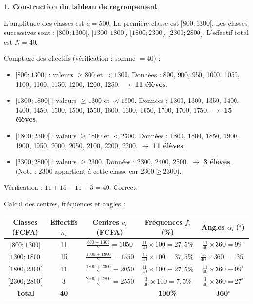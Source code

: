 \documentclass[11pt]{article}
\begin{document}
\begin{exoresolu}
\underline{\textbf{1. Construction du tableau de regroupement}}

L'amplitude des classes est $a = 500$. La première classe est $[800 ; 1300[$. Les classes successives sont :
$[800 ; 1300[$, $[1300 ; 1800[$, $[1800 ; 2300[$, $[2300 ; 2800[$.
L'effectif total est $N = 40$.

Comptage des effectifs (vérification : somme $= 40$) :
\begin{itemize}
    \item $[800 ; 1300[$ : valeurs $\ge 800$ et $< 1300$.
        Données : 800, 900, 950, 1000, 1050, 1100, 1100, 1150, 1200, 1200, 1250. $\rightarrow$ \textbf{11 élèves}.
    \item $[1300 ; 1800[$ : valeurs $\ge 1300$ et $< 1800$.
        Données : 1300, 1300, 1350, 1400, 1400, 1450, 1500, 1500, 1550, 1600, 1600, 1650, 1700, 1700, 1750. $\rightarrow$ \textbf{15 élèves}.
    \item $[1800 ; 2300[$ : valeurs $\ge 1800$ et $< 2300$.
        Données : 1800, 1800, 1850, 1900, 1900, 1950, 2000, 2050, 2100, 2200, 2200. $\rightarrow$ \textbf{11 élèves}.
    \item $[2300 ; 2800[$ : valeurs $\ge 2300$.
        Données : 2300, 2400, 2500. $\rightarrow$ \textbf{3 élèves}. (Note : 2300 appartient à cette classe car $2300 \ge 2300$).
\end{itemize}
Vérification : $11 + 15 + 11 + 3 = 40$. Correct.

Calcul des centres, fréquences et angles :
\begin{center}
\begin{tabular}{|c|c|c|c|c|}\hline
\textbf{Classes (FCFA)} & \textbf{Effectifs $n_i$} & \textbf{Centres $c_i$ (FCFA)} & \textbf{Fréquences $f_i$ (\%)} & \textbf{Angles $\alpha_i$ ($^\circ$)} \\\hline
$[800 ; 1300[$ & 11 & $\frac{800+1300}{2} = 1050$ & $\frac{11}{40}\times 100 = 27,5\%$ & $\frac{11}{40}\times 360 = 99^\circ$ \\\hline
$[1300 ; 1800[$ & 15 & $\frac{1300+1800}{2} = 1550$ & $\frac{15}{40}\times 100 = 37,5\%$ & $\frac{15}{40}\times 360 = 135^\circ$ \\\hline
$[1800 ; 2300[$ & 11 & $\frac{1800+2300}{2} = 2050$ & $\frac{11}{40}\times 100 = 27,5\%$ & $\frac{11}{40}\times 360 = 99^\circ$ \\\hline
$[2300 ; 2800[$ & 3 & $\frac{2300+2800}{2} = 2550$ & $\frac{3}{40}\times 100 = 7,5\%$ & $\frac{3}{40}\times 360 = 27^\circ$ \\\hline
\textbf{Total} & \textbf{40} & & \textbf{100\%} & \textbf{360$^\circ$} \\\hline
\end{tabular}
\end{center}


\end{exoresolu}
\end{document}
